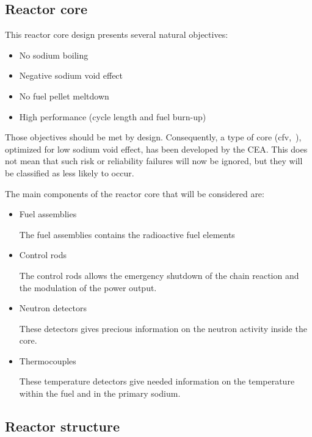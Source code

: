 \subsection{Reactor core}
\label{subsec2:core}

This reactor core design presents several natural objectives:
\begin{itemize}  
\item No sodium boiling 
\item Negative sodium void effect 
\item No fuel pellet meltdown
\item High performance (cycle length and fuel burn-up)
\end{itemize}


Those objectives should be met by design. Consequently, a type of core (\gls{cfv},~\cite{mschenaud01}), optimized for low sodium void effect, has been developed by the CEA. This does not mean that such risk or reliability failures will now be ignored, but they will be classified as less likely to occur.

The main components of the reactor core that will be considered are:
\begin{itemize}
\item Fuel assemblies

    The fuel assemblies contains the radioactive fuel elements

\item Control rods 

    The control rods allows the emergency shutdown of the chain reaction and the modulation of the power output.

\item Neutron detectors

    These detectors gives precious information on the neutron activity inside the core.

\item Thermocouples

    These temperature detectors give needed information on the temperature within the fuel and in the primary sodium.
\end{itemize}


\subsection{Reactor structure}
\label{subsec2:structure}

